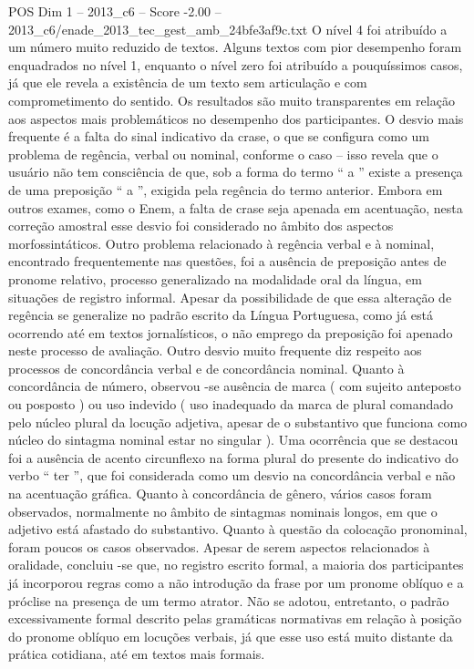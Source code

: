 \begin{textsample}{POS Dim 1 – 2013\_c6 – Score -2.00 – 2013\_c6/enade\_2013\_tec\_gest\_amb\_24bfe3af9c.txt}
O nível 4 foi atribuído a um número muito reduzido de textos.
Alguns textos com pior desempenho foram enquadrados no nível 1, enquanto o nível zero foi atribuído a pouquíssimos casos, já que ele revela a existência de um texto sem articulação e com comprometimento do sentido.
Os resultados são muito transparentes em relação aos aspectos mais problemáticos no desempenho dos participantes.
O desvio mais frequente é a falta do sinal indicativo da crase, o que se configura como um problema de regência, verbal ou nominal, conforme o caso – isso revela que o usuário não tem consciência de que, sob a forma do termo “ a ” existe a presença de uma preposição “ a ”, exigida pela regência do termo anterior.
Embora em outros exames, como o Enem, a falta de crase seja apenada em acentuação, nesta correção amostral esse desvio foi considerado no âmbito dos aspectos morfossintáticos.
Outro problema relacionado à regência verbal e à nominal, encontrado frequentemente nas questões, foi a ausência de preposição antes de pronome relativo, processo generalizado na modalidade oral da língua, em situações de registro informal.
Apesar da possibilidade de que essa alteração de regência se generalize no padrão escrito da Língua Portuguesa, como já está ocorrendo até em textos jornalísticos, o não emprego da preposição foi apenado neste processo de avaliação.
Outro desvio muito frequente diz respeito aos processos de concordância verbal e de concordância nominal.
Quanto à concordância de número, observou -se ausência de marca ( com sujeito anteposto ou posposto ) ou uso indevido ( uso inadequado da marca de plural comandado pelo núcleo plural da locução adjetiva, apesar de o substantivo que funciona como núcleo do sintagma nominal estar no singular ).
Uma ocorrência que se destacou foi a ausência de acento circunflexo na forma plural do presente do indicativo do verbo “ ter ”, que foi considerada como um desvio na concordância verbal e não na acentuação gráfica.
Quanto à concordância de gênero, vários casos foram observados, normalmente no âmbito de sintagmas nominais longos, em que o adjetivo está afastado do substantivo.
Quanto à questão da colocação pronominal, foram poucos os casos observados.
Apesar de serem aspectos relacionados à oralidade, concluiu -se que, no registro escrito formal, a maioria dos participantes já incorporou regras como a não introdução da frase por um pronome oblíquo e a próclise na presença de um termo atrator.
Não se adotou, entretanto, o padrão excessivamente formal descrito pelas gramáticas normativas em relação à posição do pronome oblíquo em locuções verbais, já que esse uso está muito distante da prática cotidiana, até em textos mais formais.

\end{textsample}
